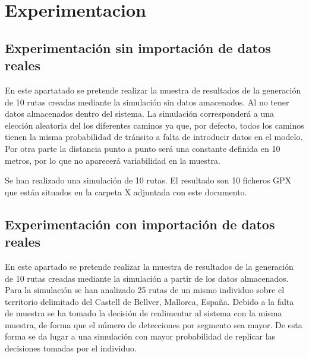 \chapter{Experimentacion}
\section{Experimentación sin importación de datos reales}
En este apartatado se pretende realizar la muestra de resultados de la generación de 10 rutas creadas 
mediante la simulación sin datos amacenados. Al no tener datos almacenados dentro del sistema. La 
simulación corresponderá a una elección aleatoria del los diferentes caminos ya que, por defecto, todos 
los caminos tienen la misma probabilidad de tránsito a falta de introducir datos en el modelo.
Por otra parte la distancia punto a punto será una constante definida en 10 metros, por lo que no 
aparecerá variabilidad en la muestra.

Se han realizado una simulación de 10 rutas. El resultado son 10 ficheros \ac{GPX} que están situados 
en la carpeta X adjuntada con este documento.

{\color{red}{INSERTAR IMAGEN DE ANÁLISIS DE ESAS 10 RUTAS}}

\section{Experimentación con importación de datos reales}
En este apartado se pretende realizar la muestra de resultados de la generación de 10 rutas creadas 
mediante la simulación a partir de los datos almacenados. 
Para la simulación se han analizado 25 rutas de un mismo individuo sobre el territorio delimitado del 
Castell de Bellver, Mallorca, España.
Debido a la falta de muestra se ha tomado la decisión de realimentar al sistema con la misma muestra, de 
forma que el número de detecciones por segmento sea mayor. De esta forma se da lugar a una simulación 
con mayor probabilidad de replicar las decisiones tomadas por el individuo.

{\color{red}{INSERTAR IMAGEN DE MAPA DE CALOR DEL CASTILLO}}

{\color{red}{INSERTAR IMAGEN DE ANÁLISIS DE ESAS 10 RUTAS}}




